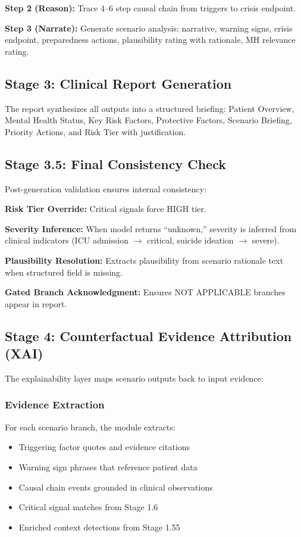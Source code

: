 \documentclass[conference]{IEEEtran}
\begin{document}
\textbf{Step 2 (Reason):} Trace 4--6 step causal chain from triggers to crisis endpoint.

\textbf{Step 3 (Narrate):} Generate scenario analysis: narrative, warning signs, crisis endpoint, preparedness actions, plausibility rating with rationale, MH relevance rating.

\subsection{Stage 3: Clinical Report Generation}

The report synthesizes all outputs into a structured briefing: Patient Overview, Mental Health Status, Key Risk Factors, Protective Factors, Scenario Briefing, Priority Actions, and Risk Tier with justification.

\subsection{Stage 3.5: Final Consistency Check}

Post-generation validation ensures internal consistency:

\textbf{Risk Tier Override:} Critical signals force HIGH tier.

\textbf{Severity Inference:} When model returns ``unknown,'' severity is inferred from clinical indicators (ICU admission $\rightarrow$ critical, suicide ideation $\rightarrow$ severe).

\textbf{Plausibility Resolution:} Extracts plausibility from scenario rationale text when structured field is missing.

\textbf{Gated Branch Acknowledgment:} Ensures NOT APPLICABLE branches appear in report.

\subsection{Stage 4: Counterfactual Evidence Attribution (XAI)}

The explainability layer maps scenario outputs back to input evidence:

\subsubsection{Evidence Extraction}
For each scenario branch, the module extracts:
\begin{itemize}
\item Triggering factor quotes and evidence citations
\item Warning sign phrases that reference patient data
\item Causal chain events grounded in clinical observations
\item Critical signal matches from Stage 1.6
\item Enriched context detections from Stage 1.55
\end{itemize}
\end{document}

